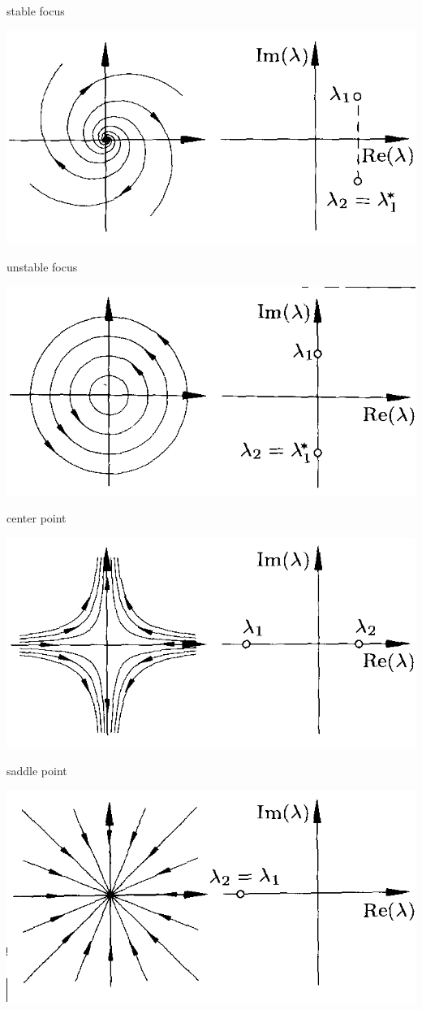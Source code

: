 \documentclass[12pt,compress]{beamer}
\begin{document}
{\begin{center}
{    stable focus
    }
    {
    \includegraphics[scale=0.5]{04_unstable_focus.png}

    unstable focus
    }
    {
    \includegraphics[scale=0.5]{05_center_point.png}

    center point
    }
    {
    \includegraphics[scale=0.5]{06_saddle_point.png}

    saddle point
    }

    {
    \includegraphics[scale=0.5]{07_star.png}

}
\end{center}}
\end{document}
